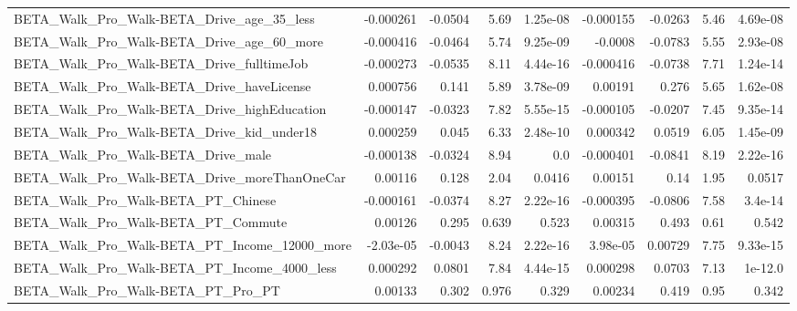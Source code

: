 \begin{tabular}{lrrrrrrrr}
BETA\_Walk\_Pro\_Walk-BETA\_Drive\_age\_35\_less          &   -0.000261 &      -0.0504 &      5.69 & 1.25e-08 &  -0.000155 &     -0.0263 &         5.46 &      4.69e-08 \\
BETA\_Walk\_Pro\_Walk-BETA\_Drive\_age\_60\_more          &   -0.000416 &      -0.0464 &      5.74 & 9.25e-09 &    -0.0008 &     -0.0783 &         5.55 &      2.93e-08 \\
BETA\_Walk\_Pro\_Walk-BETA\_Drive\_fulltimeJob          &   -0.000273 &      -0.0535 &      8.11 & 4.44e-16 &  -0.000416 &     -0.0738 &         7.71 &      1.24e-14 \\
BETA\_Walk\_Pro\_Walk-BETA\_Drive\_haveLicense          &    0.000756 &        0.141 &      5.89 & 3.78e-09 &    0.00191 &       0.276 &         5.65 &      1.62e-08 \\
BETA\_Walk\_Pro\_Walk-BETA\_Drive\_highEducation        &   -0.000147 &      -0.0323 &      7.82 & 5.55e-15 &  -0.000105 &     -0.0207 &         7.45 &      9.35e-14 \\
BETA\_Walk\_Pro\_Walk-BETA\_Drive\_kid\_under18          &    0.000259 &        0.045 &      6.33 & 2.48e-10 &   0.000342 &      0.0519 &         6.05 &      1.45e-09 \\
BETA\_Walk\_Pro\_Walk-BETA\_Drive\_male                 &   -0.000138 &      -0.0324 &      8.94 &      0.0 &  -0.000401 &     -0.0841 &         8.19 &      2.22e-16 \\
BETA\_Walk\_Pro\_Walk-BETA\_Drive\_moreThanOneCar       &     0.00116 &        0.128 &      2.04 &   0.0416 &    0.00151 &        0.14 &         1.95 &        0.0517 \\
BETA\_Walk\_Pro\_Walk-BETA\_PT\_Chinese                 &   -0.000161 &      -0.0374 &      8.27 & 2.22e-16 &  -0.000395 &     -0.0806 &         7.58 &       3.4e-14 \\
BETA\_Walk\_Pro\_Walk-BETA\_PT\_Commute                 &     0.00126 &        0.295 &     0.639 &    0.523 &    0.00315 &       0.493 &         0.61 &         0.542 \\
BETA\_Walk\_Pro\_Walk-BETA\_PT\_Income\_12000\_more       &   -2.03e-05 &      -0.0043 &      8.24 & 2.22e-16 &   3.98e-05 &     0.00729 &         7.75 &      9.33e-15 \\
BETA\_Walk\_Pro\_Walk-BETA\_PT\_Income\_4000\_less        &    0.000292 &       0.0801 &      7.84 & 4.44e-15 &   0.000298 &      0.0703 &         7.13 &       1e-12.0 \\
BETA\_Walk\_Pro\_Walk-BETA\_PT\_Pro\_PT                  &     0.00133 &        0.302 &     0.976 &    0.329 &    0.00234 &       0.419 &         0.95 &         0.342 \\

\end{tabular}
